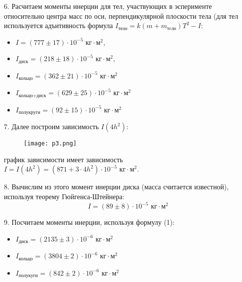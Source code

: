 6. Расчитаем моменты инерции для тел, участвующих в
эсперименте относительно центра масс по оси, перпендикулярной
плоскости тела (для тел используется адъитивность формула
$I_\text{тело} = k\left(m + m_\text{тeло}\right)T^2 - I$:
\begin{itemize}
    \item $I = \left(777 \pm 17\right) \cdot 10^{-5} \text{ кг} \cdot \text{м}^2$,
    \item $I_\text{диск} = (218 \pm 18) \cdot 10^{-5} \text{ кг} \cdot \text {м}^2$,
    \item $I_\text{кольцо} = \left(362 \pm 21\right) \cdot 10^{-5} \text{ кг} \cdot \text {м}^2$
    \item $I_\text{кольцо+диск} = \left(629 \pm 25\right) \cdot 10^{-5} \text{ кг} \cdot \text {м}^2$
    \item $I_\text{полукруги} = \left(92 \pm 15\right) \cdot 10^{-5} \text{ кг} \cdot \text {м}^2$
\end{itemize}

7. Далее построим зависимость $I\left(4h^2\right)$:

\begin{figure}[H]
    \centering
\texttt{[image: p3.png]}
    \label{fig:my_label}
\end{figure}

график зависимости имеет зависимость
$I = I\left(4h^2\right) = \left(871 + 3 \cdot 4h^2\right) \cdot 10^{-5} \text{ кг} \cdot \text {м}^2$.

8. Вычислим из этого момент инерции диска (масса считается
известной), используя теорему Гюйгенса-Штейнера:
\begin{equation*}
    I = \left(89 \pm 8\right) \cdot 10^{-5} \text{ кг} \cdot \text{м}^2
\end{equation*}

9. Посчитаем моменты инерции, используя формулу (1):
\begin{itemize}
    \item $I_\text{диск} = (2135 \pm 3) \cdot 10^{-6} \text{ кг} \cdot \text{м}^2$
    \item $I_\text{кольцо} = \left(3804 \pm 2\right) \cdot 10^{-6} \text{ кг} \cdot \text{м}^2$
    \item $I_\text{полукуги} = \left(842 \pm 2\right) \cdot 10^{-6} \text{ кг} \cdot \text{м}^2$
\end{itemize}
